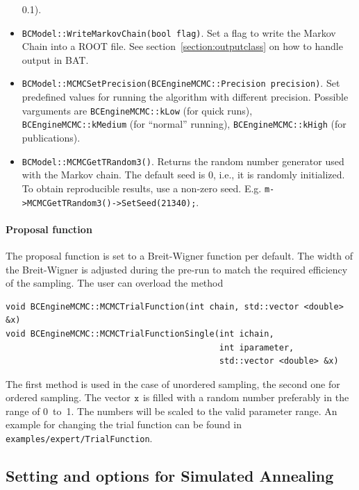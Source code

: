 \documentclass[11pt, a4paper]{article}
\begin{document}
\begin{itemize}
  0.1).
\item \verb|BCModel::WriteMarkovChain(bool flag)|. Set a flag to
 write the Markov Chain into a ROOT file. See
 section~\ref{section:outputclass} on how to handle output in BAT.
\item
  \verb|BCModel::MCMCSetPrecision(BCEngineMCMC::Precision precision)|. Set
  predefined values for running the algorithm with different
  precision. Possible varguments are \linebreak \verb|BCEngineMCMC::kLow| (for
  quick runs), \verb|BCEngineMCMC::kMedium| (for ``normal'' running),
  \linebreak \verb|BCEngineMCMC::kHigh| (for publications).
\item \verb|BCModel::MCMCGetTRandom3()|. Returns the random number
generator used with the Markov chain. The default seed is 0, i.e.,
it is randomly initialized. To obtain reproducible results, use 
a non-zero seed. E.g.
\verb|m->MCMCGetTRandom3()->SetSeed(21340);|.
\end{itemize}

\paragraph{Proposal function}

The proposal function is set to a Breit-Wigner function per
default. The width of the Breit-Wigner is adjusted during the pre-run
to match the required efficiency of the sampling. The user can
overload the method
%
\begin{verbatim}
void BCEngineMCMC::MCMCTrialFunction(int chain, std::vector <double> &x)
void BCEngineMCMC::MCMCTrialFunctionSingle(int ichain,
                                           int iparameter,
                                           std::vector <double> &x)
\end{verbatim}

The first method is used in the case of unordered sampling, the second
one for ordered sampling. The vector $\verb|x|$ is filled with a
random number preferably in the range of 0~to~1. The numbers will be
scaled to the valid parameter range. An example for changing the trial
function can be found in \verb|examples/expert/TrialFunction|.\\


\subsection{Setting and options for Simulated Annealing}
\label{section:settings:SA}
\end{document}
